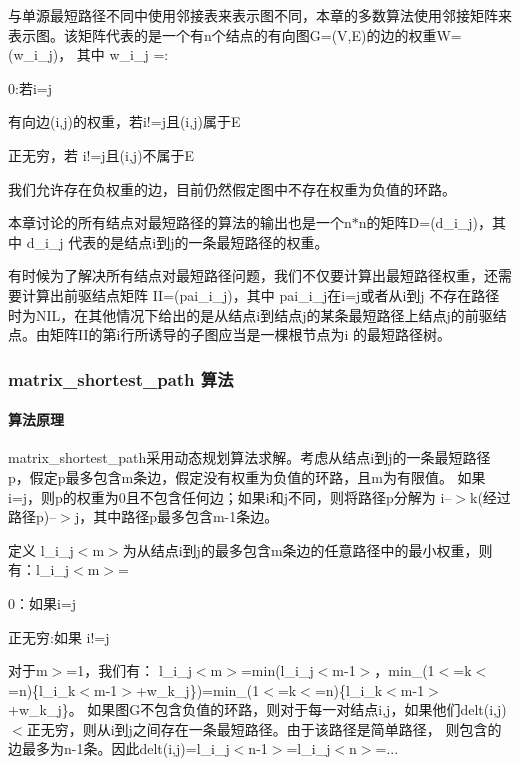 与单源最短路径不同中使用邻接表来表示图不同，本章的多数算法使用邻接矩阵来表示图。该矩阵代表的是一个有n个结点的有向图\+G=(V,E)的边的权重\+W=(w\+\_\+i\+\_\+j)， 其中 w\+\_\+i\+\_\+j =\+:


\begin{DoxyItemize}
\item 0\+:若i=j
\item 有向边(i,j)的权重，若i!=j且(i,j)属于\+E
\item 正无穷，若 i!=j且(i,j)不属于\+E
\end{DoxyItemize}

我们允许存在负权重的边，目前仍然假定图中不存在权重为负值的环路。

本章讨论的所有结点对最短路径的算法的输出也是一个n$\ast$n的矩阵\+D=(d\+\_\+i\+\_\+j)，其中 d\+\_\+i\+\_\+j 代表的是结点i到j的一条最短路径的权重。

有时候为了解决所有结点对最短路径问题，我们不仅要计算出最短路径权重，还需要计算出前驱结点矩阵 I\+I=(pai\+\_\+i\+\_\+j)，其中 pai\+\_\+i\+\_\+j在i=j或者从i到j 不存在路径时为\+N\+I\+L，在其他情况下给出的是从结点i到结点j的某条最短路径上结点j的前驱结点。由矩阵\+I\+I的第i行所诱导的子图应当是一棵根节点为i 的最短路径树。

\subsubsection*{matrix\+\_\+shortest\+\_\+path 算法}

\paragraph*{算法原理}

matrix\+\_\+shortest\+\_\+path采用动态规划算法求解。考虑从结点i到j的一条最短路径p，假定p最多包含m条边，假定没有权重为负值的环路，且m为有限值。 如果 i=j，则p的权重为0且不包含任何边；如果i和j不同，则将路径p分解为 i--$>$k(经过路径p\textquotesingle{})--$>$j，其中路径p\textquotesingle{}最多包含m-\/1条边。

定义 l\+\_\+i\+\_\+j$<$m$>$为从结点i到j的最多包含m条边的任意路径中的最小权重，则有：l\+\_\+i\+\_\+j$<$m$>$=


\begin{DoxyItemize}
\item 0：如果i=j
\item 正无穷\+:如果 i!=j
\end{DoxyItemize}

对于m$>$=1，我们有： l\+\_\+i\+\_\+j$<$m$>$=min(l\+\_\+i\+\_\+j$<$m-\/1$>$，min\+\_\+(1$<$=k$<$=n)\{l\+\_\+i\+\_\+k$<$m-\/1$>$+w\+\_\+k\+\_\+j\})=min\+\_\+(1$<$=k$<$=n)\{l\+\_\+i\+\_\+k$<$m-\/1$>$+w\+\_\+k\+\_\+j\}。 如果图\+G不包含负值的环路，则对于每一对结点i,j，如果他们delt(i,j)$<$正无穷，则从i到j之间存在一条最短路径。由于该路径是简单路径， 则包含的边最多为n-\/1条。因此delt(i,j)=l\+\_\+i\+\_\+j$<$n-\/1$>$=l\+\_\+i\+\_\+j$<$n$>$=...

